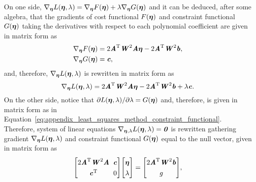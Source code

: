 On one side, $\nabla_{\bs{\eta}} L\left(\bs{\eta},\lambda\right)=\nabla_{\bs{\eta}} F\left(\bs{\eta}\right)+\lambda\nabla_{\bs{\eta}}G\left(\bs{\eta}\right)$ and it can be deduced, after some algebra, that the gradients of cost functional $F\left(\bs{\eta}\right)$ and constraint functional $G\left(\bs{\eta}\right)$ taking the derivatives with respect to each polynomial coefficient are given in matrix form as
\begin{align}
&\nabla_{\bs{\eta}} F\left(\bs{\eta}\right)=2\bm{A}^\text{T}\bm{W}^{2}\bm{A}\bs{\eta}-2\bm{A}^\text{T}\bm{W}^{2}\bm{b},
\label{eq:appendix_least_squares_method_lagrange_multipliers_method_equation2_1}\\
&\nabla_{\bs{\eta}}G(\bs{\eta})=\bm{c},
\label{eq:appendix_least_squares_method_lagrange_multipliers_method_equation2_2}
\end{align}
and, therefore, $\nabla_{\bs{\eta}} L\left(\bs{\eta},\lambda\right)$ is rewritten in matrix form as
\begin{equation}
\label{eq:appendix_least_squares_method_lagrange_multipliers_method_equation3}
\nabla_{\bs{\eta}} L\left(\bs{\eta},\lambda\right)=2\bm{A}^\text{T}\bm{W}^{2}\bm{A}\bs{\eta}-2\bm{A}^\text{T}\bm{W}^{2}\bm{b}+\lambda\bm{c}.
\end{equation}
On the other side, notice that $\partial L\left(\bs{\eta},\lambda\right)/\partial\lambda=G\left(\bs{\eta}\right)$ and, therefore, is given in matrix form as in Equation~\cref{eq:appendix_least_squares_method_constraint_functional}.
Therefore, system of linear equations $\nabla_{\bs{\eta},\lambda} L\left(\bs{\eta},\lambda\right)=\bm{0}$ is rewritten gathering gradient $\nabla_{\bs{\eta}} L\left(\bs{\eta},\lambda\right)$ and constraint functional $G\left(\bs{\eta}\right)$ equal to the null vector, given in matrix form as
\begin{equation}
\label{eq:appendix_least_squares_method_lagrange_multipliers_method_equation4}
\setlength\arraycolsep{0.1cm}
\renewcommand{\arraystretch}{1.3}
\begin{bmatrix}
2\bm{A}^{\textrm{T}}\bm{W}^{2}\bm{A} & \bm{c}\\
\bm{c}^{\textrm{T}} & 0
\end{bmatrix}
\begin{bmatrix}
\bs{\eta}\\
\lambda
\end{bmatrix}
=
\begin{bmatrix}
2\bm{A}^{\textrm{T}}\bm{W}^{2}\bm{b}\\
g
\end{bmatrix},
\end{equation}

